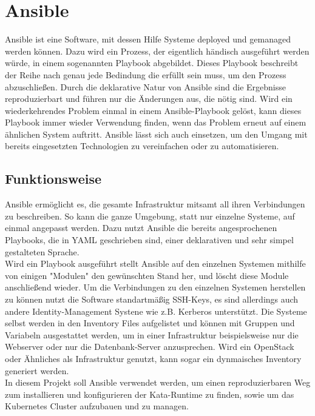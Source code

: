 \section{Ansible}
Ansible ist eine Software, mit dessen Hilfe Systeme deployed und gemanaged werden können. 
Dazu wird ein Prozess, der eigentlich händisch ausgeführt werden würde, in einem sogenannten Playbook abgebildet.
Dieses Playbook beschreibt der Reihe nach genau jede Bedindung die erfüllt sein muss, um den Prozess abzuschließen.
Durch die deklarative Natur von Ansible sind die Ergebnisse reproduzierbart und führen nur die Änderungen aus, die nötig sind.
Wird ein wiederkehrendes Problem einmal in einem Ansible-Playbook gelöst, kann dieses Playbook immer wieder Verwendung finden, wenn das Problem erneut auf einem ähnlichen System auftritt.
Ansible lässt sich auch einsetzen, um den Umgang mit bereits eingesetzten Technologien zu vereinfachen oder zu automatisieren.
\cite{ansible}

\subsection{Funktionsweise}
Ansible ermöglicht es, die gesamte Infrastruktur mitsamt all ihren Verbindungen zu beschreiben. 
So kann die ganze Umgebung, statt nur einzelne Systeme, auf einmal angepasst werden.
Dazu nutzt Ansible die bereits angesprochenen Playbooks, die in \ac{YAML} geschrieben sind, einer deklarativen und sehr simpel gestalteten Sprache.
\\
Wird ein Playbook ausgeführt stellt Ansible auf den einzelnen Systemen mithilfe von einigen "Modulen" den gewünschten Stand her, und löscht diese Module anschließend wieder. 
Um die Verbindungen zu den einzelnen Systemen herstellen zu können nutzt die Software standartmäßig \ac{SSH}-Keys, es sind allerdings auch andere Identity-Management Systene wie z.B. Kerberos unterstützt.
Die Systeme selbst werden in den Inventory Files aufgelistet und können mit Gruppen und Variabeln ausgestattet werden, um in einer Infrastruktur beispielsweise nur die Webserver oder nur die Datenbank-Server anzusprechen.
Wird ein OpenStack oder Ähnliches als Infrastruktur genutzt, kann sogar ein dynmaisches Inventory generiert werden.
\cite{how_ansible_works}
\\
In diesem Projekt soll Ansible verwendet werden, um einen reproduzierbaren Weg zum installieren und konfigurieren der Kata-Runtime zu finden, sowie um das Kubernetes Cluster aufzubauen und zu managen. 


